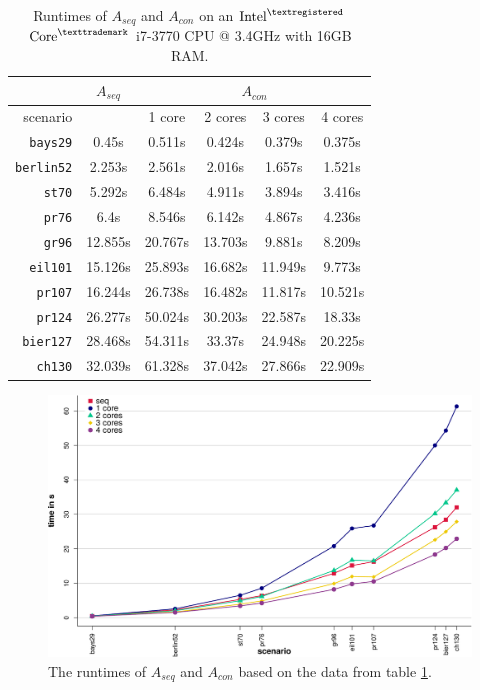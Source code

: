 \begin{table}[h!]
  \centering
  \begin{tabular}{r|c||c|c|c|c|}
    \cline{2-6}
    & \multicolumn{1}{c||}{$A_{seq}$} & \multicolumn{4}{c|}{$A_{con}$} \\
    \hline
    \multicolumn{1}{|r||}{scenario} & & 1 core & 2 cores & 3 cores & 4 cores \\
    \hline
    \hline
    \multicolumn{1}{|r||}{\texttt{bays29}} & 0.45s & 0.511s & 0.424s & 0.379s & 0.375s \\
    \hline
    \multicolumn{1}{|r||}{\texttt{berlin52}} & 2.253s & 2.561s & 2.016s & 1.657s & 1.521s \\
    \hline
    \multicolumn{1}{|r||}{\texttt{st70}} & 5.292s & 6.484s & 4.911s & 3.894s & 3.416s \\
    \hline
    \multicolumn{1}{|r||}{\texttt{pr76}} & 6.4s & 8.546s & 6.142s & 4.867s & 4.236s \\
    \hline
    \multicolumn{1}{|r||}{\texttt{gr96}} & 12.855s & 20.767s & 13.703s & 9.881s & 8.209s \\
    \hline
    \multicolumn{1}{|r||}{\texttt{eil101}} & 15.126s & 25.893s & 16.682s & 11.949s & 9.773s \\
    \hline
    \multicolumn{1}{|r||}{\texttt{pr107}} & 16.244s & 26.738s & 16.482s & 11.817s & 10.521s \\
    \hline
    \multicolumn{1}{|r||}{\texttt{pr124}} & 26.277s & 50.024s & 30.203s & 22.587s & 18.33s \\
    \hline
    \multicolumn{1}{|r||}{\texttt{bier127}} & 28.468s & 54.311s & 33.37s & 24.948s & 20.225s \\
    \hline
    \multicolumn{1}{|r||}{\texttt{ch130}} & 32.039s & 61.328s & 37.042s & 27.866s & 22.909s \\
    \hline
  \end{tabular}
  \caption{Runtimes of $A_{seq}$ and $A_{con}$ on an $\text{Intel}^{\textregistered}$ $\text{Core}^{\texttrademark}$ i7-3770 CPU @ 3.4GHz with 16GB RAM.}
  \vspace*{-0.75em}
  \label{tbl:test1}
\end{table}

\begin{figure}[h!]
  \centering
  \includegraphics[width=\textwidth]{img/test_local.pdf}
  \caption{The runtimes of $A_{seq}$ and $A_{con}$ based on the data from table \ref{tbl:test1}.}
  \label{fig:test1}
\end{figure}

